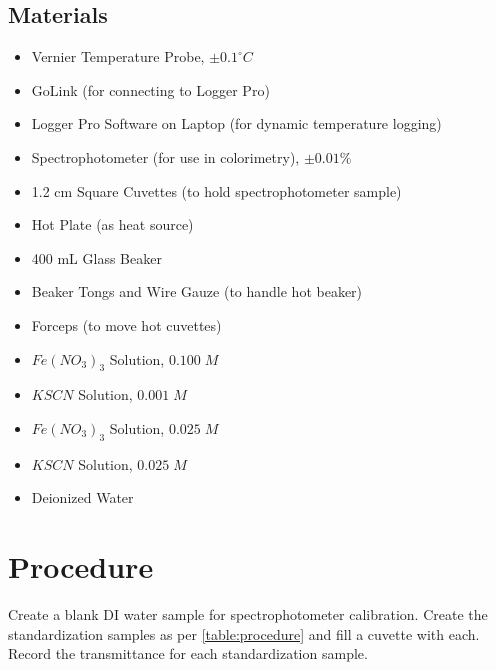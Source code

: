 \subsection{Materials}
\begin{itemize}[noitemsep,nolistsep]
    \item Vernier Temperature Probe, $\pm 0.1^\circ C$
    \item GoLink (for connecting to Logger Pro)
    \item Logger Pro Software on Laptop (for dynamic temperature logging)
    \item Spectrophotometer (for use in colorimetry), $\pm 0.01 \%$ 
    \item 1.2 cm Square Cuvettes (to hold spectrophotometer sample)
    \item Hot Plate (as heat source)
    \item 400 mL Glass Beaker
    \item Beaker Tongs and Wire Gauze (to handle hot beaker)
    \item Forceps (to move hot cuvettes)
    \item $Fe(NO_3)_3$ Solution, $0.100 \; M$
    \item $KSCN$ Solution, $0.001 \; M$
    \item $Fe(NO_3)_3$ Solution, $0.025 \; M$
    \item $KSCN$ Solution, $0.025 \; M$
    \item Deionized Water
\end{itemize}




\section{Procedure}
\label{section:procedure}
Create a blank DI water sample for spectrophotometer calibration. Create the standardization samples as per \cref{table:procedure} and fill a cuvette with each. Record the transmittance for each standardization sample.

